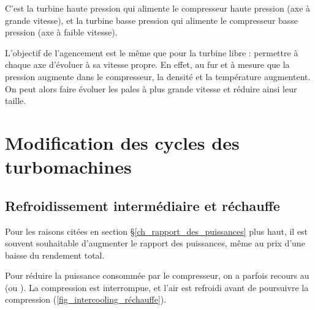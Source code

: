 {{		C’est la turbine haute pression qui alimente le compresseur haute pression (axe à grande vitesse), et la turbine basse pression qui alimente le compresseur basse pression (axe à faible vitesse).

		L’objectif de l’agencement est le même que pour la turbine libre : permettre à chaque axe d’évoluer à sa vitesse propre. En effet, au fur et à mesure que la pression augmente dans le compresseur, la densité et la température augmentent. On peut alors faire évoluer les pales à plus grande vitesse et réduire ainsi leur taille.




\section{Modification des cycles des turbomachines}


	\subsection{Refroidissement intermédiaire et réchauffe}

		Pour les raisons citées en section \S\ref{ch_rapport_des_puissances} plus haut, il est souvent souhaitable d’aug\-menter le rapport des puissances, même au prix d’une baisse du rendement total.

		Pour réduire la puissance consommée par le compresseur, on a parfois recours au  (ou ). La compression est interrompue, et l’air est refroidi avant de poursuivre la compression (\cref{fig_intercooling_réchauffe}).

}}

